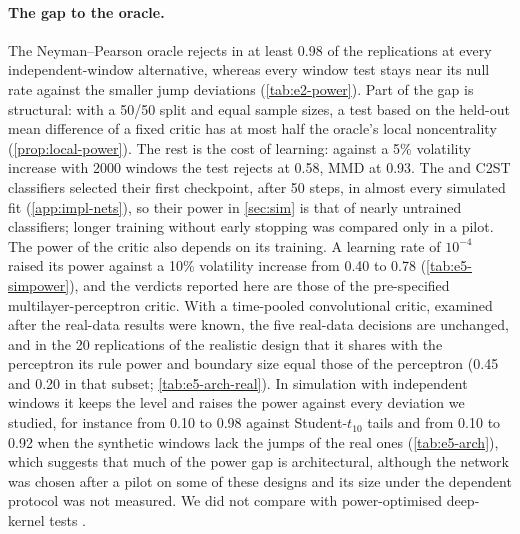 \paragraph{The gap to the oracle.}
The Neyman--Pearson oracle rejects in at least 0.98 of the replications at every independent-window
alternative, whereas every window test stays near its null rate against the smaller jump
deviations (\cref{tab:e2-power}). Part of the gap is structural: with a 50/50 split and equal
sample sizes, a test based on the held-out mean difference of a fixed critic has at most half the
oracle's local noncentrality (\cref{prop:local-power}). The rest is the cost of learning: against
a 5\% volatility increase with 2000 windows the \WC{} test rejects at 0.58, MMD at 0.93. The
\LRC{} and C2ST classifiers selected their first checkpoint, after 50 steps, in almost every
simulated fit (\cref{app:impl-nets}), so their power in \cref{sec:sim} is that of nearly
untrained classifiers; longer training without early stopping was compared only in a pilot. The
power of the critic also depends on its training. A learning rate of $10^{-4}$ raised its power against
a 10\% volatility increase from 0.40 to 0.78 (\cref{tab:e5-simpower}), and the verdicts reported
here are those of the pre-specified multilayer-perceptron critic. With a time-pooled
convolutional critic, examined after the real-data results were known, the five real-data
decisions are unchanged, and in the 20 replications of the realistic design that it shares with
the perceptron its rule power and boundary size equal those of the perceptron (0.45 and 0.20 in
that subset; \cref{tab:e5-arch-real}). In simulation with independent windows it keeps the level and raises
the power against every deviation we studied, for instance from 0.10 to 0.98 against
Student-$t_{10}$ tails and from 0.10 to 0.92 when the synthetic windows lack the jumps of the
real ones (\cref{tab:e5-arch}), which suggests that much of the power gap is architectural,
although the network was chosen after a pilot on some of these designs and its size under the
dependent protocol was not measured. We did not compare with power-optimised deep-kernel tests
\citep{liu2020learning}.

